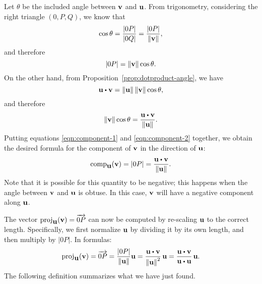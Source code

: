 Let $\theta$ be the included angle between $\mbox{\bf v}$ and
$\mbox{\bf u}$. From trigonometry, considering the right triangle
$(0,P,Q)$, we know that
\begin{equation*}
  \cos \theta = \frac{|0P|}{|0Q|} = \frac{|0P|}{\left\|\mbox{\bf v}\right\|},
\end{equation*}
and therefore
\begin{equation}\label{eqn:component-1}
  |0P| = \left\|\mbox{\bf v}\right\| \cos \theta.
\end{equation}
On the other hand, from Proposition~\ref{prop:dotproduct-angle},  we
have
\begin{equation*}
  \vect{u}\dotprod \vect{v}=\norm{\vect{u}} \norm{\vect{v}} \cos \theta,
\end{equation*}
and therefore
\begin{equation}\label{eqn:component-2}
  \norm{\vect{v}} \cos \theta = \frac{\vect{u}\dotprod \vect{v}}{\norm{\vect{u}}}.
\end{equation}
Putting equations {\eqref{eqn:component-1}} and
{\eqref{eqn:component-2}} together, we obtain the desired formula for
the component of $\mbox{\bf v}$ in the direction of $\mbox{\bf u}$:
\begin{equation}\label{eqn:component}
  \func{comp}_{\vect{u}}(\vect{v})
  = |0P|
  = \frac{\vect{u}\dotprod \vect{v}}{\norm{\vect{u}}}.
\end{equation}
Note that it is possible for this quantity to be negative; this
happens when the angle between $\mbox{\bf v}$ and $\mbox{\bf u}$ is obtuse.
In this case, $\mbox{\bf v}$ will have a negative component along
$\mbox{\bf u}$.

The vector $\mbox{\rm proj}_{\mbox{\bf u}}(\mbox{\bf v})=\overrightarrow{0P}$ can now be
computed by re-scaling $\mbox{\bf u}$ to the correct length. Specifically,
we first normalize $\mbox{\bf u}$ by dividing it by its own length, and
then multiply by $|0P|$. In formulas:
\begin{equation}
  \func{proj}_{\vect{u}}(\vect{v})
  = \longvect{0P}
  = \frac{|0P|}{\norm{\vect{u}}}\vect{u}
  = \frac{\vect{u}\dotprod \vect{v}}{\norm{\vect{u}}^2}\,\vect{u}
  = \frac{\vect{u}\dotprod \vect{v}}{\vect{u}\dotprod \vect{u}}\,\vect{u}.
\end{equation}
The following definition summarizes what we have just found.

